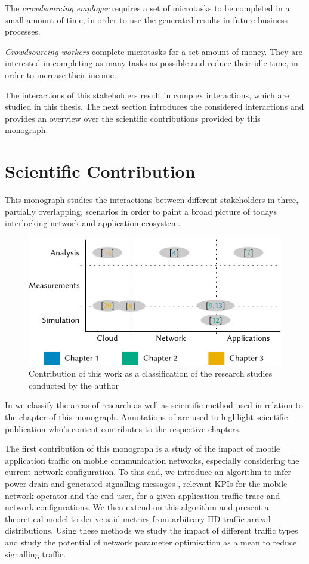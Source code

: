 The \emph{crowdsourcing employer} requires a set of microtasks to be completed in a small amount of time, in order to use the generated results in future business processes.

\emph{Crowdsourcing workers} complete microtasks for a set amount of money.
They are interested in completing as many tasks as possible and reduce their idle time, in order to increase their income.

The interactions of this stakeholders result in complex interactions, which are studied in this thesis.
The next section introduces the considered interactions and provides an overview over the scientific contributions provided by this monograph.

\section{Scientific Contribution}\label{sec:introduction:scientific_contribution}
This monograph studies the interactions between different stakeholders in three, partially overlapping, scenarios in order to paint a broad picture of todays interlocking network and application ecosystem.

\begin{figure}
\centering
\includegraphics{figures/publications}
\caption{Contribution of this work as a classification of the research studies conducted by the author}\label{fig:introduction:publications}
\end{figure}

In  we classify the areas of research as well as scientific method used in relation to the chapter of this monograph.
Annotations of are used to highlight scientific publication who's content contributes to the respective chapters.

The first contribution of this monograph is a study of the impact of mobile application traffic on mobile communication networks, especially considering the current network configuration.
To this end, we introduce an algorithm to infer power drain and generated signalling messages , relevant \glspl{KPI} for the mobile network operator and the end user, for a given application traffic trace and network configurations.
We then extend on this algorithm and present a theoretical model to derive said metrics from arbitrary \gls{IID} traffic arrival distributions.
Using these methods we study the impact of different traffic types and study the potential of network parameter optimisation as a mean to reduce signalling traffic.


